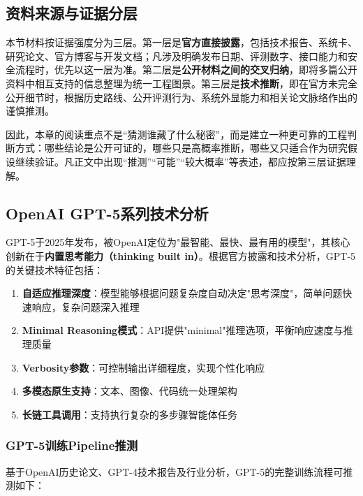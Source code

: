 \documentclass[12pt,a4paper]{article}
\begin{document}
\subsection{资料来源与证据分层}

本节材料按证据强度分为三层。第一层是\textbf{官方直接披露}，包括技术报告、系统卡、研究论文、官方博客与开发文档；凡涉及明确发布日期、评测数字、接口能力和安全流程时，优先以这一层为准。第二层是\textbf{公开材料之间的交叉归纳}，即将多篇公开资料中相互支持的信息整理为统一工程图景。第三层是\textbf{技术推断}，即在官方未完全公开细节时，根据历史路线、公开评测行为、系统外显能力和相关论文脉络作出的谨慎推测。

因此，本章的阅读重点不是“猜测谁藏了什么秘密”，而是建立一种更可靠的工程判断方式：哪些结论是公开可证的，哪些只是高概率推断，哪些又只适合作为研究假设继续验证。凡正文中出现“推测”“可能”“较大概率”等表述，都应按第三层证据理解。

\subsection{OpenAI GPT-5系列技术分析}

GPT-5于2025年发布，被OpenAI定位为"最智能、最快、最有用的模型"，其核心创新在于\textbf{内置思考能力（thinking built in）}。根据官方披露和技术分析，GPT-5的关键技术特征包括：

\begin{enumerate}[label=(\arabic*)]
    \item \textbf{自适应推理深度}：模型能够根据问题复杂度自动决定"思考深度"，简单问题快速响应，复杂问题深入推理
    \item \textbf{Minimal Reasoning模式}：API提供"minimal"推理选项，平衡响应速度与推理质量
    \item \textbf{Verbosity参数}：可控制输出详细程度，实现个性化响应
    \item \textbf{多模态原生支持}：文本、图像、代码统一处理架构
    \item \textbf{长链工具调用}：支持执行复杂的多步骤智能体任务
\end{enumerate}

\subsubsection{GPT-5训练Pipeline推测}

基于OpenAI历史论文、GPT-4技术报告及行业分析，GPT-5的完整训练流程可推测如下：
\end{document}
